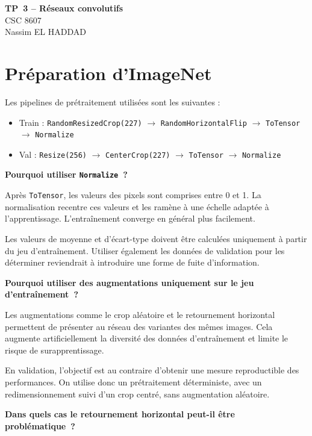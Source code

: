 \documentclass[11pt,a4paper]{article}
\begin{document}
\begin{center}
  {\LARGE\bfseries TP~3 -- Réseaux convolutifs}\\[0.35cm]
  {\large CSC 8607}\\[0.6cm]
  Nassim EL HADDAD
\end{center}
\vspace{0.4cm}

\section{Préparation d'ImageNet}

Les pipelines de prétraitement utilisées sont les suivantes :

\begin{itemize}
  \item Train : \texttt{RandomResizedCrop(227)} $\to$ \texttt{RandomHorizontalFlip} $\to$ \texttt{ToTensor} $\to$ \texttt{Normalize}
  \item Val : \texttt{Resize(256)} $\to$ \texttt{CenterCrop(227)} $\to$ \texttt{ToTensor} $\to$ \texttt{Normalize}
\end{itemize}

\textbf{Pourquoi utiliser \texttt{Normalize}~?}

Après \texttt{ToTensor}, les valeurs des pixels sont comprises entre 0 et 1.
La normalisation recentre ces valeurs et les ramène à une échelle adaptée
à l'apprentissage. L'entraînement converge en général plus facilement.

Les valeurs de moyenne et d'écart-type doivent être calculées uniquement à partir
du jeu d'entraînement. Utiliser également les données de validation pour les
déterminer reviendrait à introduire une forme de fuite d'information.

\textbf{Pourquoi utiliser des augmentations uniquement sur le jeu d'entraînement~?}

Les augmentations comme le crop aléatoire et le retournement horizontal permettent
de présenter au réseau des variantes des mêmes images. Cela augmente artificiellement
la diversité des données d'entraînement et limite le risque de surapprentissage.

En validation, l'objectif est au contraire d'obtenir une mesure reproductible des
performances. On utilise donc un prétraitement déterministe, avec un redimensionnement
suivi d'un crop centré, sans augmentation aléatoire.

\textbf{Dans quels cas le retournement horizontal peut-il être problématique~?}
\end{document}
